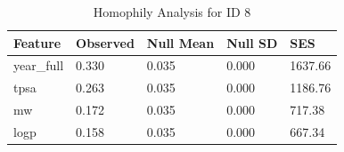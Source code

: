 \begin{table}
\caption{Homophily Analysis for ID 8}
\label{tab:homophily_id8}
\begin{tabular}{lllll}
\toprule
Feature & Observed & Null Mean & Null SD & SES \\
\midrule
year_full & 0.330 & 0.035 & 0.000 & 1637.66 \\
tpsa & 0.263 & 0.035 & 0.000 & 1186.76 \\
mw & 0.172 & 0.035 & 0.000 & 717.38 \\
logp & 0.158 & 0.035 & 0.000 & 667.34 \\
\bottomrule
\end{tabular}
\end{table}
